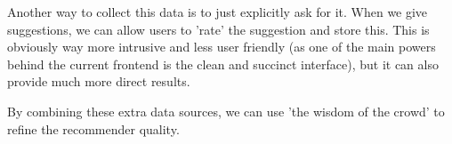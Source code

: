 Another way to collect this data is to just explicitly ask for it.
When we give suggestions, we can allow users to 'rate' the suggestion and store this.
This is obviously way more intrusive and less user friendly (as one of the main powers behind the current frontend is the clean and succinct interface), but it can also provide much more direct results.

By combining these extra data sources, we can use 'the wisdom of the crowd' to refine the recommender quality.
